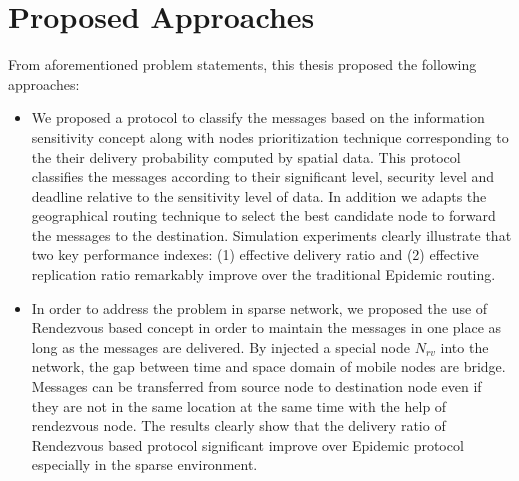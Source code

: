 \section{Proposed Approaches}
\label{intro:Proposed Approaches}
From aforementioned problem statements, this thesis proposed the following approaches:
\begin{itemize}
  \item %
  We proposed a protocol to classify the messages based on the information sensitivity concept along with nodes prioritization technique corresponding to the their delivery probability computed by spatial data. 
  This protocol classifies the messages according to their significant level, security level and deadline relative to the sensitivity level of data. 
  In addition we adapts the geographical routing technique to select the best candidate node to forward the messages to the destination. 
  Simulation experiments clearly illustrate that two key performance indexes: (1) effective delivery ratio and (2) effective replication ratio remarkably improve over the traditional Epidemic routing. 
  
  
  \item %
In order to address the problem in sparse network, we proposed the use of Rendezvous based concept in order to maintain the messages in one place as long as the messages are delivered. 
By injected a special node $N_{rv}$ into the network, the gap between time and space domain of mobile nodes are bridge. Messages can be transferred from source node to destination node even if they are not in the same location at the same time with the help of rendezvous node. 
The results clearly show that the delivery ratio of Rendezvous based protocol significant improve over Epidemic protocol especially in the sparse environment.
\end{itemize}

